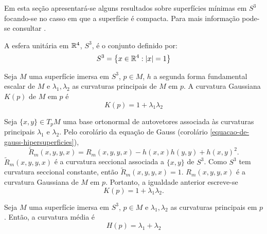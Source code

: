 Em esta seção apresentará-se alguns resultados sobre superfícies mínimas em $S^3$ focando-se no casso em que a superfície é compacta. Para mais informação pode-se consultar \cite{Brendle2013}.

\begin{definicao}
	A esfera unitária em $\mathbb{R}^4$, $S^3$, é o conjunto definido por:
	\begin{equation*}
	S^3 = \left\{ x \in \mathbb{R}^4: | x | = 1 \right\}
	\end{equation*}
\end{definicao}

\begin{proposicao}
	Seja $M$ uma superfície imersa em $S^3$,
	$p \in M$,
	$h$ a segunda forma fundamental escalar de $M$ e
	$\lambda_1, \lambda_2$ as curvaturas principais de $M$ em $p$.
	A curvatura Gaussiana $K(p)$ de $M$ em $p$ é
	\begin{equation*}
		K(p) = 1 + \lambda_1 \lambda_2
	\end{equation*}
\end{proposicao}

\begin{demonstracao}
	Seja $\{x,y\} \in T_p M$ uma base ortonormal de autovetores associada às curvaturas principais $\lambda_1$ e $\lambda_2$.
	Pelo corolário da equação de Gauss (corolário \ref{equacao-de-gauss-hipersuperficies}),
	\begin{equation*}
		\tilde{R}_m(x,y,y,x) = R_m(x,y,y,x) - h(x,x) h(y,y) + h(x,y)^2.
	\end{equation*}
	$\tilde{R}_m(x,y,y,x)$ é a curvatura seccional associada a $\{x,y\}$ de $S^3$. Como $S^3$ tem curvatura seccional constante, então $\tilde{R}_m(x,y,y,x) = 1$. 
	$R_m(x,y,y,x)$ é a curvatura Gaussiana de $M$ em $p$. Portanto, a igualdade anterior escreve-se
	\begin{equation*}
		K(p) = 1 + \lambda_1 \lambda_2.
	\end{equation*}
\end{demonstracao}



\begin{proposicao}
	Seja $M$ uma superfície imersa em $S^3$,
	$p \in M$ e
	$\lambda_1, \lambda_2$ as curvaturas principais em $p$.
	Então, a curvatura média é
	\begin{equation*}
		H(p) = \lambda_1 + \lambda_2
	\end{equation*}
\end{proposicao}

